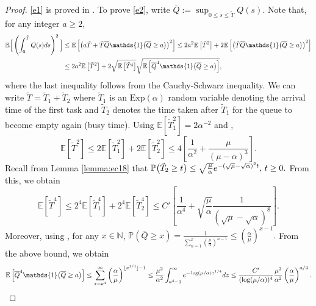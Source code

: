 \documentclass[11pt, reqno]{article}
\DeclarePairedDelimiter\autobracket{(}{)}
\newcommand{\br}[1]{\autobracket*{#1}}
\numberwithin{equation}{section}
\numberwithin{theorem}{section}
\begin{document}
\begin{appendix}
\begin{proof}
\eqref{e1} is proved in \cite[Lemma EC.19]{GW19}. To prove \eqref{e2}, write $\overline{Q} := \sup_{0 \le s \le \tilde{T}}Q(s)$. Note that, for any integer $a \ge 2$,
\begin{align}\label{e21}
\mathbb{E}\Big[\left(\int_0^{\Tilde{T}}Q(s)ds\right)^2\Big] &\le \mathbb{E}\left[\left(a\Tilde{T} + \Tilde{T}\overline{Q}\mathds{1}\br{\overline{Q} \ge a}\right)^2\right] \le 2a^2 \mathbb{E}\left[\tilde{T}^2\right] + 2\mathbb{E}\left[\left(\Tilde{T}\overline{Q}\mathds{1}\br{\overline{Q} \ge a}\right)^2\right]\nonumber\\
&\le 2a^2 \mathbb{E}\left[\tilde{T}^2\right] + 2\sqrt{\mathbb{E}\left[\tilde{T}^4\right]}\sqrt{\mathbb{E}\left[\overline{Q}^4\mathds{1}\br{\overline{Q} \ge a}\right]},
\end{align}
where the last inequality follows from the Cauchy-Schwarz inequality. We can write $\tilde{T} = \tilde{T}_1 + \tilde{T}_2$ where $\tilde{T}_1$ is an $\mathrm{Exp}(\alpha)$ random variable denoting the arrival time of the first task and $\tilde{T}_2$ denotes the time taken after $\tilde{T}_1$ for the queue to become empty again (busy time). Using $\mathbb{E}[\tilde{T}_1^2] = 2\alpha^{-2}$ and \cite[Section 7.9, Page 75]{adan2017queueing},
\begin{equation}\label{e22}
\mathbb{E}\left[\tilde{T}^2\right] \le 2 \mathbb{E}\left[\tilde{T}_1^2\right] + 2 \mathbb{E}\left[\tilde{T}_2^2\right] \le 4\left[\frac{1}{\alpha^2} + \frac{\mu}{(\mu - \alpha)^3}\right].
\end{equation}
Recall from Lemma \ref{lemma:ec18} that
$
\mathbb{P}\br{\Tilde{T}_2\geq t}\leq \sqrt{\frac{\mu}{\alpha}}e^{-(\sqrt{\mu}-\sqrt{\alpha})^2t}, \, t \ge 0.
$
From this, we obtain
\begin{equation}\label{e23}
\mathbb{E}\left[\tilde{T}^4\right] \le 2^4 \mathbb{E}\left[\tilde{T}_1^4\right] + 2^4 \mathbb{E}\left[\tilde{T}_2^4\right] \le C'\left[\frac{1}{\alpha^4} + \sqrt{\frac{\mu}{\alpha}}\frac{1}{(\sqrt{\mu} - \sqrt{\alpha})^8}\right].
\end{equation}
Moreover, using \cite[Lemma EC.17]{GW19}, for any $x \in \mathbb{N}$,
$
\mathbb{P}\left(\overline{Q} \ge x\right) = \frac{1}{\sum_{n=1}^x \left(\frac{\mu}{\alpha}\right)^{n-1}} \le \left(\frac{\alpha}{\mu}\right)^{x-1}.
$
From the above bound, we obtain
\begin{align}\label{e24}
\mathbb{E}\left[\overline{Q}^4\mathds{1}\br{\overline{Q} \ge a}\right] \le \sum_{x=a^4}^{\infty} \left(\frac{\alpha}{\mu}\right)^{\lfloor x^{1/4}\rfloor-1} \le \frac{\mu^2}{\alpha^2}\int_{a^4-1}^{\infty} e^{-\log(\mu/\alpha) z^{1/4}}dz \le \frac{C'}{(\log(\mu/\alpha))^4}\frac{\mu^2}{\alpha^2} \left(\frac{\alpha}{\mu}\right)^{a/4}.

\end{align}
\end{proof}
\end{appendix}
\end{document}
